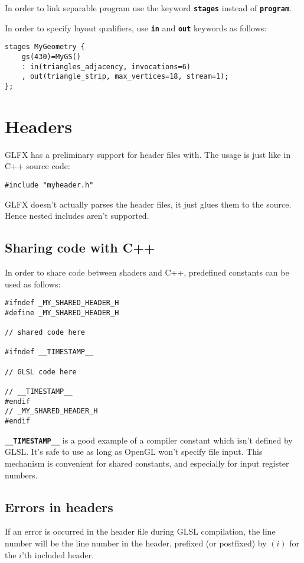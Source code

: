 \documentclass[11pt,a4paper,final,titlepage]{article}
\begin{document}
In order to link separable program use the keyword \texttt{\textbf{stages}} instead of
\texttt{\textbf{program}}.

In order to specify layout qualifiers, use \texttt{\textbf{in}} and \texttt{\textbf{out}} keywords
as follows:
\begin{lstlisting}
stages MyGeometry {
	gs(430)=MyGS()
	: in(triangles_adjacency, invocations=6)
	, out(triangle_strip, max_vertices=18, stream=1);
};
\end{lstlisting}

\pagebreak
\section{Headers}
GLFX has a preliminary support for header files with. The usage is just like in C++ source
code:
\begin{lstlisting}
#include "myheader.h"
\end{lstlisting}

GLFX doesn't actually parses the header files, it just glues them to the source. Hence nested
includes aren't supported.

\subsection{Sharing code with C++}
In order to share code between shaders and C++, predefined constants can be used as follows:
\begin{lstlisting}
#ifndef _MY_SHARED_HEADER_H
#define _MY_SHARED_HEADER_H

// shared code here

#ifndef __TIMESTAMP__

// GLSL code here

// __TIMESTAMP__
#endif
// _MY_SHARED_HEADER_H
#endif
\end{lstlisting}

\texttt{\textbf{\_\_TIMESTAMP\_\_}} is a good example of a compiler constant which isn't defined by GLSL.
It's safe to use as long as OpenGL won't specify file input.
This mechanism is convenient for shared constants, and especially for input register numbers.

\subsection{Errors in headers}
If an error is occurred in the header file during GLSL compilation, the line number
will be the line number in the header, prefixed (or postfixed) by $(i)$ for the $i$'th
included header.
\end{document}

